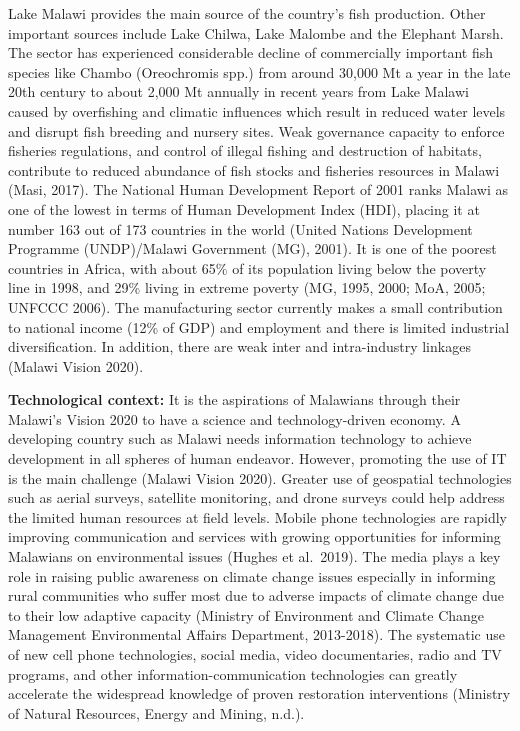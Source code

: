 \documentclass[
]{book}
\begin{document}
Lake Malawi provides the main source of the country's fish production. Other important sources include Lake Chilwa, Lake Malombe and the Elephant Marsh. The
sector has experienced considerable decline of commercially important fish species like Chambo (Oreochromis spp.) from around 30,000 Mt a year in the late 20th
century to about 2,000 Mt annually in recent years from Lake Malawi caused by overfishing and climatic influences which result in reduced water levels and
disrupt fish breeding and nursery sites. Weak governance capacity to enforce fisheries regulations, and control of illegal fishing and destruction of habitats,
contribute to reduced abundance of fish stocks and fisheries resources in Malawi (Masi, 2017). The National Human Development Report of 2001 ranks Malawi as one
of the lowest in terms of Human Development Index (HDI), placing it at number 163 out of 173 countries in the world (United Nations Development Programme
(UNDP)/Malawi Government (MG), 2001). It is one of the poorest countries in Africa, with about 65\% of its population living below the poverty line in 1998, and
29\% living in extreme poverty (MG, 1995, 2000; MoA, 2005; UNFCCC 2006). The manufacturing sector currently makes a small contribution to national income (12\% of
GDP) and employment and there is limited industrial diversification. In addition, there are weak inter and intra-industry linkages (Malawi Vision 2020).

\textbf{Technological context:} It is the aspirations of Malawians through their Malawi's Vision 2020 to have a science and technology-driven economy. A developing
country such as Malawi needs information technology to achieve development in all spheres of human endeavor. However, promoting the use of IT is the main
challenge (Malawi Vision 2020). Greater use of geospatial technologies such as aerial surveys, satellite monitoring, and drone surveys could help address the
limited human resources at field levels. Mobile phone technologies are rapidly improving communication and services with growing opportunities for informing
Malawians on environmental issues (Hughes et al.~2019). The media plays a key role in raising public awareness on climate change issues especially in informing
rural communities who suffer most due to adverse impacts of climate change due to their low adaptive capacity (Ministry of Environment and Climate Change
Management Environmental Affairs Department, 2013-2018). The systematic use of new cell phone technologies, social media, video documentaries, radio and TV
programs, and other information-communication technologies can greatly accelerate the widespread knowledge of proven restoration interventions (Ministry of
Natural Resources, Energy and Mining, n.d.).
\end{document}
